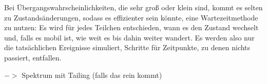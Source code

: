 \documentclass[a4paper,10pt]{article}
\begin{document}
Bei Übergangswahrscheinlichkeiten, die sehr groß oder klein sind, kommt es selten zu Zustandsänderungen, sodass es effizienter sein könnte, eine Wartezeitmethode zu nutzen: Es wird für jedes Teilchen entschieden, wann es den Zustand wechselt und, falls es mobil ist, wie weit es bis dahin weiter wandert. Es werden also nur die tatsächlichen Ereignisse simuliert, Schritte für Zeitpunkte, zu denen nichts passiert, entfallen.









$->$ Spektrum mit Tailing (falls das rein kommt)


\listoftodos
\end{document}
